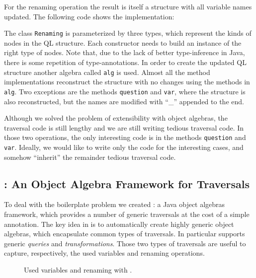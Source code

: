 For the renaming operation the result is itself a structure
with all variable names updated. The following code shows the
implementation:


The class \lstinline{Renaming} is parameterized by three types,
which represent the kinds of nodes in the QL structure. Each
constructor needs to build an instance of the right type of nodes.
Note that, due to the lack of better type-inference in Java, there is
some repetition of type-annotations. In order to create the updated
QL structure another algebra called \lstinline{alg} is used.
Almost all the method implementations reconstruct the structure with
no changes using the methods in \lstinline{alg}. Two exceptions are the
methods \lstinline{question} and \lstinline{var}, where the structure is also reconstructed, but
the names are modified with ``\_'' appended to the end.

Although we solved the problem of extensibility with object
algebras, the traversal code is still lengthy and we are still writing
tedious traversal code. In those two operations, the only interesting code
is in the methods \lstinline{question} and \lstinline{var}. Ideally, we would like to write only
the code for the interesting cases, and somehow ``inherit'' the
remainder tedious traversal code.

\subsection{\Name: An Object Algebra Framework for Traversals}

To deal with the boilerplate problem we created \Name: a Java object
algebras framework, which provides a number of generic traversals at
the cost of a simple annotation. The key idea in \name is to
automatically create highly generic object algebras, which encapsulate
common types of traversals. In particular \name supports generic
\emph{queries} and \emph{transformations}. Those two types of
traversals are useful to capture, respectively, the used variables and
renaming operations.

\begin{figure}[t]
\nocaptionrule
\vspace{-.1in}
\caption{Used variables and renaming with \Name.}
\label{ql_with_oaframework}
\end{figure}

